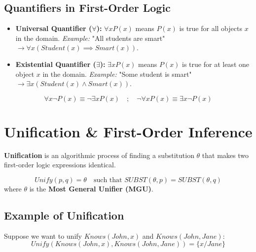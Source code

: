 \documentclass[12pt,a4paper]{article}
\begin{document}
\subsection{Quantifiers in First-Order Logic}
\begin{itemize}[leftmargin=*, itemsep=4pt]
  \item \textbf{Universal Quantifier ($\forall$):} $\forall x P(x)$ means $P(x)$ is true for all objects $x$ in the domain.
    \textit{Example:} "All students are smart" $\to \forall x (Student(x) \implies Smart(x))$.
  \item \textbf{Existential Quantifier ($\exists$):} $\exists x P(x)$ means $P(x)$ is true for at least one object $x$ in the domain.
    \textit{Example:} "Some student is smart" $\to \exists x (Student(x) \land Smart(x))$.
\end{itemize}

\begin{tcolorbox}[examplebox, title={Quantifier Duality Rules}]
  \begin{equation}
    \forall x \neg P(x) \equiv \neg \exists x P(x) \quad ; \quad \neg \forall x P(x) \equiv \exists x \neg P(x)
  \end{equation}
\end{tcolorbox}

\section{Unification \& First-Order Inference}

\begin{tcolorbox}[defbox, title={Definition of Unification}]
  \textbf{Unification} is an algorithmic process of finding a substitution $\theta$ that makes two first-order logic expressions identical.
\end{tcolorbox}

\begin{tcolorbox}[formulabox, title={Unification Function}]
  \begin{equation}
    Unify(p, q) = \theta \quad \text{such that } SUBST(\theta, p) = SUBST(\theta, q)
  \end{equation}
  where $\theta$ is the \textbf{Most General Unifier (MGU)}.
\end{tcolorbox}

\subsection{Example of Unification}
Suppose we want to unify $Knows(John, x)$ and $Knows(John, Jane)$:
\begin{equation}
  Unify(Knows(John, x), Knows(John, Jane)) = \{x / Jane\}
\end{equation}
\end{document}
